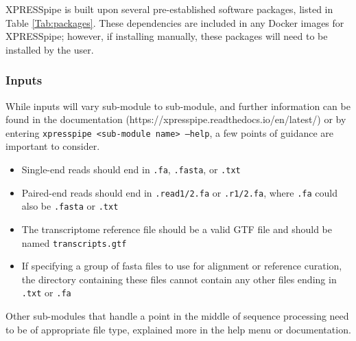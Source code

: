\documentclass[11pt, a4paper, oneside]{article}
\begin{document}
XPRESSpipe is built upon several pre-established software packages, listed in Table \ref{Tab:packages}. These dependencies are included in any Docker images for XPRESSpipe; however, if installing manually, these packages will need to be installed by the user.

\subsubsection{Inputs}
While inputs will vary sub-module to sub-module, and further information can be found in the documentation (https://xpresspipe.readthedocs.io/en/latest/) or by entering \texttt{xpresspipe \textless sub-module name\textgreater \ --help}, a few points of guidance are important to consider.

\begin{itemize}
\item Single-end reads should end in \texttt{.fa}, \texttt{.fasta}, or \texttt{.txt}
\item Paired-end reads should end in \texttt{.read1/2.fa} or \texttt{.r1/2.fa}, where \texttt{.fa} could also be \texttt{.fasta} or \texttt{.txt}
\item The transcriptome reference file should be a valid GTF file and should be named \texttt{transcripts.gtf}
\item If specifying a group of fasta files to use for alignment or reference curation, the directory containing these files cannot contain any other files ending in \texttt{.txt} or \texttt{.fa}
\end{itemize}

Other sub-modules that handle a point in the middle of sequence processing need to be of appropriate file type, explained more in the help menu or documentation.
\end{document}
